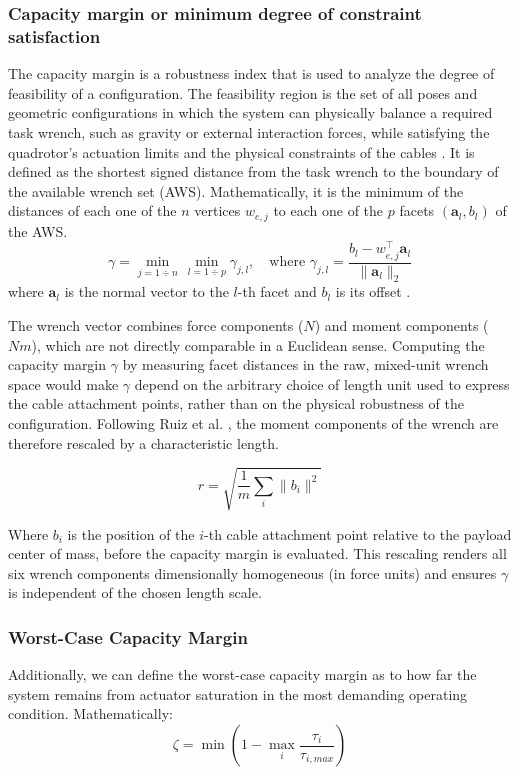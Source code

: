 \subsubsection{Capacity margin or minimum degree of constraint satisfaction}
The capacity margin is a robustness index that is used to analyze the degree of feasibility of a configuration. The feasibility region is the set of all poses and geometric configurations in which the system can physically balance a required task wrench, such as gravity or external interaction forces, while satisfying the quadrotor's actuation limits and the physical constraints of the cables \cite{erskine_wrench_2019}. It is defined as the shortest signed distance from the task wrench to the boundary of the available wrench set (AWS). Mathematically, it is the minimum of the distances of each one of the $n$ vertices $w_{e, j}$ to each one of the $p$ facets $\left( \mathbf{a}_l, b_l\right)$ of the AWS.
\begin{equation}
    \gamma = \min_{j = 1 \div n} \, \min_{l = 1\div p} \gamma_{j, l}, \quad \text{where } \gamma_{j, l} = \frac{b_l - w_{e, j}^\top \mathbf{a}_l}{\|\mathbf{a}_l\|_2}
\end{equation}
where $\mathbf{a}_l$ is the normal vector to the $l$-th facet and $b_l$ is its offset \cite{pott_arachnis_2015}.

The wrench vector combines force components ($N$) and moment components ($Nm$), which are not directly comparable in a Euclidean sense. Computing the capacity margin $\gamma$ by measuring facet distances in the raw, mixed-unit wrench space would make $\gamma$ depend on the arbitrary choice of length unit used to express the cable attachment points, rather than on the physical robustness of the configuration. Following Ruiz et al. \cite{pott_arachnis_2015}, the moment components of the wrench are therefore rescaled by a characteristic length.

\begin{equation}
    r = \sqrt{\frac{1}{m} \sum_i \|b_i\|^2}
\end{equation}

Where $b_i$ is the position of the $i$-th cable attachment point relative to the payload center of mass, before the capacity margin is evaluated. This rescaling renders all six wrench components dimensionally homogeneous (in force units) and ensures $\gamma$ is independent of the chosen length scale.

\subsubsection{Worst-Case Capacity Margin}
Additionally, we can define the worst-case capacity margin as to how far the system remains from actuator saturation in the most demanding operating condition. Mathematically:
\begin{equation}
    \zeta = \min \left(1 - \max_i \frac{\tau_i}{\tau_{i, max}} \right)
\end{equation}

